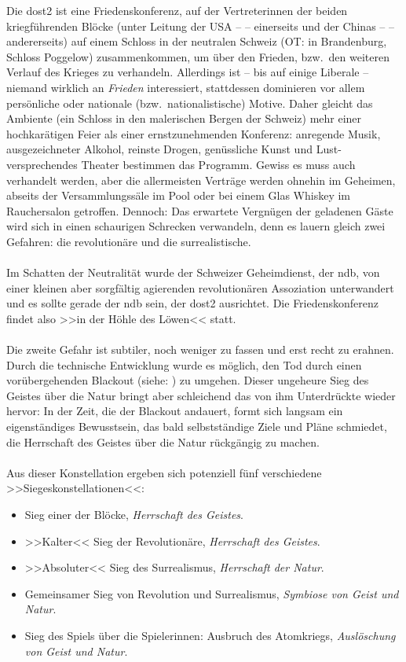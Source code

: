 Die \ac{dost2} ist eine Friedenskonferenz, auf der Vertreterinnen der beiden
kriegführenden Blöcke (unter Leitung der USA --  --
einerseits und der Chinas --  -- andererseits) auf
einem Schloss in der neutralen Schweiz (OT: in Brandenburg, Schloss Poggelow)
zusammenkommen, um über den Frieden, bzw.~den weiteren Verlauf des Krieges zu
verhandeln.
Allerdings ist -- bis auf einige Liberale -- niemand wirklich an \emph{Frieden}
interessiert, stattdessen dominieren vor allem persönliche oder nationale
(bzw.~nationalistische) Motive. Daher gleicht das Ambiente (ein Schloss in den
malerischen Bergen der Schweiz) mehr einer hochkarätigen Feier als einer
ernstzunehmenden Konferenz: anregende Musik, ausgezeichneter Alkohol, reinste
Drogen, genüssliche Kunst und Lust-versprechendes Theater bestimmen das
Programm. Gewiss es muss auch verhandelt werden, aber die allermeisten Verträge
werden ohnehin im Geheimen, abseits der Versammlungssäle im Pool oder bei einem
Glas Whiskey im Rauchersalon getroffen. Dennoch: Das erwartete Vergnügen der
geladenen Gäste wird sich in einen schaurigen Schrecken verwandeln, denn es
lauern gleich zwei Gefahren: die revolutionäre und die surrealistische.\\\\
%
Im Schatten der Neutralität wurde der Schweizer Geheimdienst, der \ac{ndb}, von
einer kleinen aber sorgfältig agierenden revolutionären Assoziation
unterwandert und es sollte gerade der \ac{ndb} sein, der \ac{dost2} ausrichtet.
Die Friedenskonferenz findet also >>in der Höhle des Löwen<< statt.\\\\
%
Die zweite Gefahr ist subtiler, noch weniger zu fassen und erst recht zu
erahnen. Durch die technische Entwicklung wurde es möglich, den Tod durch einen
vorübergehenden Blackout (siehe: ) zu umgehen.
Dieser ungeheure Sieg des Geistes über die Natur bringt aber schleichend das von
ihm Unterdrückte wieder hervor: 
In der Zeit, die der Blackout andauert, formt sich langsam ein eigenständiges
Bewusstsein, das bald selbstständige Ziele und Pläne schmiedet, die Herrschaft
des Geistes über die Natur rückgängig zu machen.\\\\
%
Aus dieser Konstellation ergeben sich potenziell fünf verschiedene
>>Siegeskonstellationen<<: 
\begin{itemize} 
  \item[] Sieg einer der Blöcke, \emph{Herrschaft des Geistes}.
  \item[] >>Kalter<< Sieg der Revolutionäre, \emph{Herrschaft des Geistes}.
  \item[] >>Absoluter<< Sieg des Surrealismus, \emph{Herrschaft der Natur}.
  \item[] Gemeinsamer Sieg von Revolution und Surrealismus, \emph{Symbiose von
    Geist und Natur}.
  \item[] Sieg des Spiels über die Spielerinnen: Ausbruch des Atomkriegs,
    \emph{Auslöschung von Geist und Natur}.
\end{itemize}
